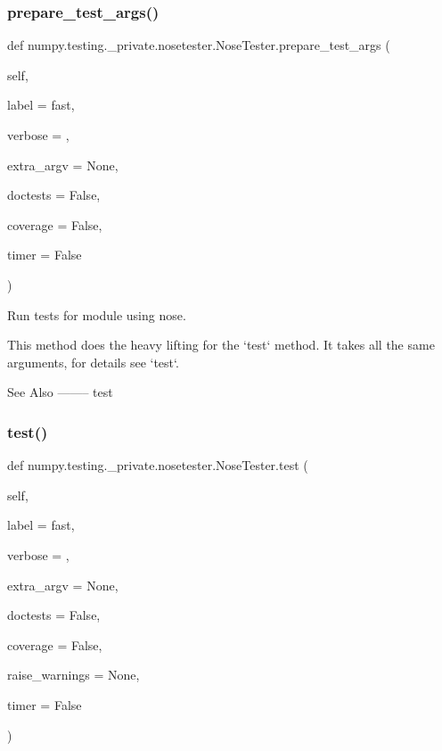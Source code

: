 \subsubsection{\texorpdfstring{prepare\+\_\+test\+\_\+args()}{prepare\_test\_args()}}
{\footnotesize\ttfamily def numpy.\+testing.\+\_\+private.\+nosetester.\+Nose\+Tester.\+prepare\+\_\+test\+\_\+args (\begin{DoxyParamCaption}\item[{}]{self,  }\item[{}]{label = {\ttfamily \textquotesingle{}fast\textquotesingle{}},  }\item[{}]{verbose = {},  }\item[{}]{extra\+\_\+argv = {\ttfamily None},  }\item[{}]{doctests = {\ttfamily False},  }\item[{}]{coverage = {\ttfamily False},  }\item[{}]{timer = {\ttfamily False} }\end{DoxyParamCaption})}

\begin{DoxyVerb}Run tests for module using nose.

This method does the heavy lifting for the `test` method. It takes all
the same arguments, for details see `test`.

See Also
--------
test\end{DoxyVerb}
 \mbox{\label{classnumpy_1_1testing_1_1__private_1_1nosetester_1_1NoseTester_a4bb93c29fd82f62ea6928836904d95ce}} 
\subsubsection{\texorpdfstring{test()}{test()}}
{\footnotesize\ttfamily def numpy.\+testing.\+\_\+private.\+nosetester.\+Nose\+Tester.\+test (\begin{DoxyParamCaption}\item[{}]{self,  }\item[{}]{label = {\ttfamily \textquotesingle{}fast\textquotesingle{}},  }\item[{}]{verbose = {},  }\item[{}]{extra\+\_\+argv = {\ttfamily None},  }\item[{}]{doctests = {\ttfamily False},  }\item[{}]{coverage = {\ttfamily False},  }\item[{}]{raise\+\_\+warnings = {\ttfamily None},  }\item[{}]{timer = {\ttfamily False} }\end{DoxyParamCaption})}

